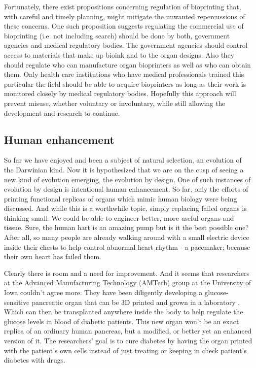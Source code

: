 \documentclass[12pt]{article} %
\begin{document}
Fortunately, there exist propositions concerning regulation of bioprinting that, with careful and timely planning, might mitigate the unwanted repercussions of these concerns. One such proposition suggests regulating the commercial use of bioprinting (i.e. not including search) should be done by both, government agencies and medical regulatory bodies. The government agencies should control access to materials that make up bioink and to the organ designs. Also they should regulate who can manufacture organ bioprinters as well as who can obtain them. Only health care institutions who have medical professionals trained this particular the field should be able to acquire bioprinters as long as their work is monitored closely by medical regulatory bodies. Hopefully this approach will prevent misuse, whether voluntary or involuntary, while still allowing the development and research to continue.


\subsection{Human enhancement} %

So far we have enjoyed and been a subject of natural selection, an evolution of the Darwinian kind. Now it is hypothesized that we are on the cusp of seeing a new kind of evolution emerging, the evolution by design. One of such instances of evolution by design is intentional human enhancement. So far, only the efforts of printing functional replicas of organs which mimic human biology were being discussed. And while this is a worthwhile topic, simply replacing failed organs is thinking small. We could be able to engineer better, more useful organs and tissue. Sure, the human hart is an amazing pump but is it the best possible one?  After all, so many people \cite{Wood:2002} are already walking around with a small electric device inside their chests to help control abnormal heart rhythm - a pacemaker; because their own heart has failed them.

Clearly there is room and a need for improvement. And it seems that researchers at the Advanced Manufacturing Technology (AMTech) group at the University of Iowa couldn't agree more. They have been diligently developing a glucose-sensitive pancreatic organ that can be 3D printed and grown in a laboratory \cite{Ozbolat:2013}. Which can then be transplanted anywhere inside the body to help regulate the glucose levels in blood of diabetic patients. This new organ won't be an exact replica of an ordinary human pancreas, but a modified, or better yet an enhanced version of it. The researchers' goal is to cure diabetes by having the organ printed with the patient's own cells instead of just treating or keeping in check patient's diabetes with drugs.
\end{document}
